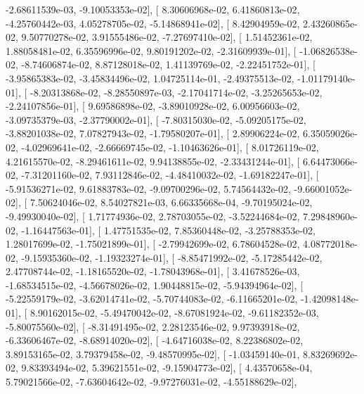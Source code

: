 \documentclass{article}
\begin{document}
         -2.68611539e-03,  -9.10053353e-02],
       [  8.30606968e-02,   6.41860813e-02,  -4.25760442e-03,
          4.05278705e-02,  -5.14868941e-02],
       [  8.42904959e-02,   2.43260865e-02,   9.50770278e-02,
          3.91555486e-02,  -7.27697410e-02],
       [  1.51452361e-02,   1.88058481e-02,   6.35596996e-02,
          9.80191202e-02,  -2.31609939e-01],
       [ -1.06826538e-02,  -8.74606874e-02,   8.87128018e-02,
          1.41139769e-02,  -2.22451752e-01],
       [ -3.95865383e-02,  -3.45834496e-02,   1.04725114e-01,
         -2.49375513e-02,  -1.01179140e-01],
       [ -8.20313868e-02,  -8.28550897e-03,  -2.17041714e-02,
         -3.25265653e-02,  -2.24107856e-01],
       [  9.69586898e-02,  -3.89010928e-02,   6.00956603e-02,
         -3.09735379e-03,  -2.37790002e-01],
       [ -7.80315030e-02,  -5.09205175e-02,  -3.88201038e-02,
          7.07827943e-02,  -1.79580207e-01],
       [  2.89906224e-02,   6.35059026e-02,  -4.02969641e-02,
         -2.66669745e-02,  -1.10463626e-01],
       [  8.01726119e-02,   4.21615570e-02,  -8.29461611e-02,
          9.94138855e-02,  -2.33431244e-01],
       [  6.64473066e-02,  -7.31201160e-02,   7.93112846e-02,
         -4.48410032e-02,  -1.69182247e-01],
       [ -5.91536271e-02,   9.61883783e-02,  -9.09700296e-02,
          5.74564432e-02,  -9.66001052e-02],
       [  7.50624046e-02,   8.54027821e-03,   6.66335668e-04,
         -9.70195024e-02,  -9.49930040e-02],
       [  1.71774936e-02,   2.78703055e-02,  -3.52244684e-02,
          7.29848960e-02,  -1.16447563e-01],
       [  1.47751535e-02,   7.85360448e-02,  -3.25788353e-02,
          1.28017699e-02,  -1.75021899e-01],
       [ -2.79942699e-02,   6.78604528e-02,   4.08772018e-02,
         -9.15935360e-02,  -1.19323274e-01],
       [ -8.85471992e-02,  -5.17285442e-02,   2.47708744e-02,
         -1.18165520e-02,  -1.78043968e-01],
       [  3.41678526e-03,  -1.68534515e-02,  -4.56678026e-02,
          1.90448815e-02,  -5.94394964e-02],
       [ -5.22559179e-02,  -3.62014741e-02,  -5.70744083e-02,
         -6.11665201e-02,  -1.42098148e-01],
       [  8.90162015e-02,  -5.49470042e-02,  -8.67081924e-02,
         -9.61182352e-03,  -5.80075560e-02],
       [ -8.31491495e-02,   2.28123546e-02,   9.97393918e-02,
         -6.33606467e-02,  -8.68914020e-02],
       [ -4.64716038e-02,   8.22386802e-02,   3.89153165e-02,
          3.79379458e-02,  -9.48570995e-02],
       [ -1.03459140e-01,   8.83269692e-02,   9.83393494e-02,
          5.39621551e-02,  -9.15904773e-02],
       [  4.43570658e-04,   5.79021566e-02,  -7.63604642e-02,
         -9.97276031e-02,  -4.55188629e-02],
\end{document}
